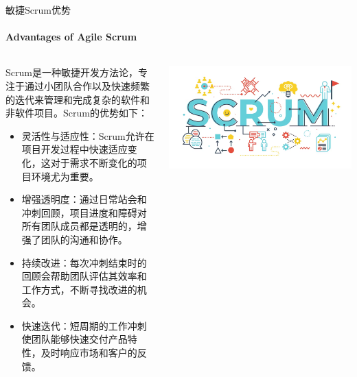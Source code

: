 \documentclass{beamer}
\begin{document}
\begin{frame}[fragile]{敏捷Scrum优势}
\framesubtitle{Advantages of Agile Scrum}
\begin{columns}
\begin{column}{0.55\textwidth}
Scrum是一种敏捷开发方法论，专注于通过小团队合作以及快速频繁的迭代来管理和完成复杂的软件和非软件项目。Scrum的优势如下：
\begin{itemize}
\item \footnotesize 灵活性与适应性：Scrum允许在项目开发过程中快速适应变化，这对于需求不断变化的项目环境尤为重要。
\item \footnotesize 增强透明度：通过日常站会和冲刺回顾，项目进度和障碍对所有团队成员都是透明的，增强了团队的沟通和协作。
\item \footnotesize 持续改进：每次冲刺结束时的回顾会帮助团队评估其效率和工作方式，不断寻找改进的机会。
\item \footnotesize 快速迭代：短周期的工作冲刺使团队能够快速交付产品特性，及时响应市场和客户的反馈。
\end{itemize}
\end{column}
\begin{column}{0.45\textwidth}
\includegraphics[width=\textwidth]
{figures/scrum}
\end{column}
\end{columns}
\end{frame}

\end{document}
